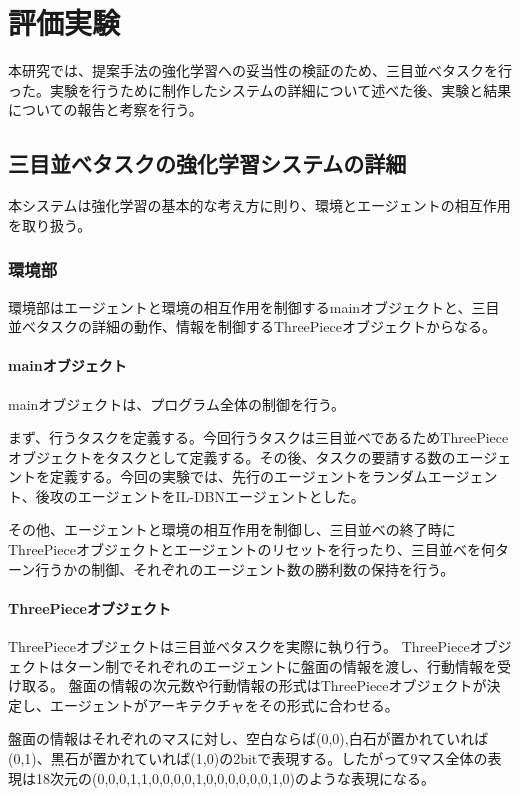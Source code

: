 \chapter{評価実験}
本研究では、提案手法の強化学習への妥当性の検証のため、三目並べタスクを行った。実験を行うために制作したシステムの詳細について述べた後、実験と結果についての報告と考察を行う。

\section{三目並べタスクの強化学習システムの詳細}
本システムは強化学習の基本的な考え方に則り、環境とエージェントの相互作用を取り扱う。

\subsection{環境部}
環境部はエージェントと環境の相互作用を制御するmainオブジェクトと、三目並べタスクの詳細の動作、情報を制御するThreePieceオブジェクトからなる。

\subsubsection{mainオブジェクト}
mainオブジェクトは、プログラム全体の制御を行う。

まず、行うタスクを定義する。今回行うタスクは三目並べであるためThreePieceオブジェクトをタスクとして定義する。その後、タスクの要請する数のエージェントを定義する。今回の実験では、先行のエージェントをランダムエージェント、後攻のエージェントをIL-DBNエージェントとした。

その他、エージェントと環境の相互作用を制御し、三目並べの終了時にThreePieceオブジェクトとエージェントのリセットを行ったり、三目並べを何ターン行うかの制御、それぞれのエージェント数の勝利数の保持を行う。

\subsubsection{ThreePieceオブジェクト}
ThreePieceオブジェクトは三目並べタスクを実際に執り行う。
ThreePieceオブジェクトはターン制でそれぞれのエージェントに盤面の情報を渡し、行動情報を受け取る。
盤面の情報の次元数や行動情報の形式はThreePieceオブジェクトが決定し、エージェントがアーキテクチャをその形式に合わせる。

盤面の情報はそれぞれのマスに対し、空白ならば(0,0),白石が置かれていれば(0,1)、黒石が置かれていれば(1,0)の2bitで表現する。したがって9マス全体の表現は18次元の(0,0,0,1,1,0,0,0,0,1,0,0,0,0,0,0,1,0)のような表現になる。

